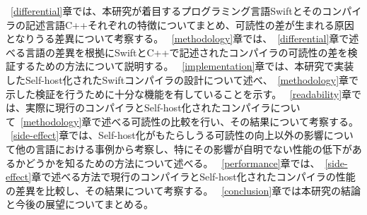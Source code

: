 ~\ref{differential}章では、本研究が着目するプログラミング言語Swiftとそのコンパイラの記述言語C++それぞれの特徴についてまとめ、可読性の差が生まれる原因となりうる差異について考察する。
~\ref{methodology}章では、~\ref{differential}章で述べる言語の差異を根拠にSwiftとC++で記述されたコンパイラの可読性の差を検証するための方法について説明する。
~\ref{implementation}章では、本研究で実装したSelf-host化されたSwiftコンパイラの設計について述べ、~\ref{methodology}章で示した検証を行うために十分な機能を有していることを示す。
~\ref{readability}章では、実際に現行のコンパイラとSelf-host化されたコンパイラについて~\ref{methodology}章で述べる可読性の比較を行い、その結果について考察する。
~\ref{side-effect}章では、Self-host化がもたらしうる可読性の向上以外の影響について他の言語における事例から考察し、特にその影響が自明でない性能の低下があるかどうかを知るための方法について述べる。
~\ref{performance}章では、~\ref{side-effect}章で述べる方法で現行のコンパイラとSelf-host化されたコンパイラの性能の差異を比較し、その結果について考察する。
~\ref{conclusion}章では本研究の結論と今後の展望についてまとめる。

